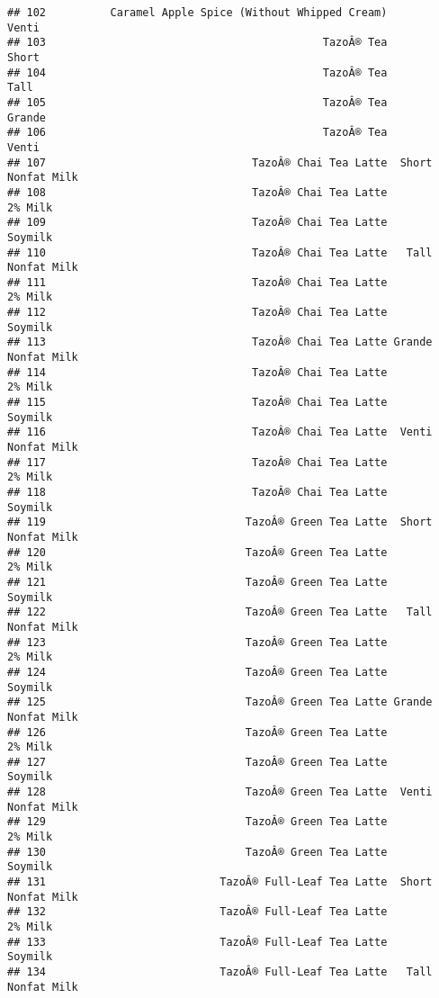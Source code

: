 \documentclass[
]{article}
\begin{document}
\begin{verbatim}
## 102          Caramel Apple Spice (Without Whipped Cream)              Venti
## 103                                           TazoÂ® Tea              Short
## 104                                           TazoÂ® Tea               Tall
## 105                                           TazoÂ® Tea             Grande
## 106                                           TazoÂ® Tea              Venti
## 107                                TazoÂ® Chai Tea Latte  Short Nonfat Milk
## 108                                TazoÂ® Chai Tea Latte            2% Milk
## 109                                TazoÂ® Chai Tea Latte            Soymilk
## 110                                TazoÂ® Chai Tea Latte   Tall Nonfat Milk
## 111                                TazoÂ® Chai Tea Latte            2% Milk
## 112                                TazoÂ® Chai Tea Latte            Soymilk
## 113                                TazoÂ® Chai Tea Latte Grande Nonfat Milk
## 114                                TazoÂ® Chai Tea Latte            2% Milk
## 115                                TazoÂ® Chai Tea Latte            Soymilk
## 116                                TazoÂ® Chai Tea Latte  Venti Nonfat Milk
## 117                                TazoÂ® Chai Tea Latte            2% Milk
## 118                                TazoÂ® Chai Tea Latte            Soymilk
## 119                               TazoÂ® Green Tea Latte  Short Nonfat Milk
## 120                               TazoÂ® Green Tea Latte            2% Milk
## 121                               TazoÂ® Green Tea Latte            Soymilk
## 122                               TazoÂ® Green Tea Latte   Tall Nonfat Milk
## 123                               TazoÂ® Green Tea Latte            2% Milk
## 124                               TazoÂ® Green Tea Latte            Soymilk
## 125                               TazoÂ® Green Tea Latte Grande Nonfat Milk
## 126                               TazoÂ® Green Tea Latte            2% Milk
## 127                               TazoÂ® Green Tea Latte            Soymilk
## 128                               TazoÂ® Green Tea Latte  Venti Nonfat Milk
## 129                               TazoÂ® Green Tea Latte            2% Milk
## 130                               TazoÂ® Green Tea Latte            Soymilk
## 131                           TazoÂ® Full-Leaf Tea Latte  Short Nonfat Milk
## 132                           TazoÂ® Full-Leaf Tea Latte            2% Milk
## 133                           TazoÂ® Full-Leaf Tea Latte            Soymilk
## 134                           TazoÂ® Full-Leaf Tea Latte   Tall Nonfat Milk

\end{verbatim}
\end{document}
